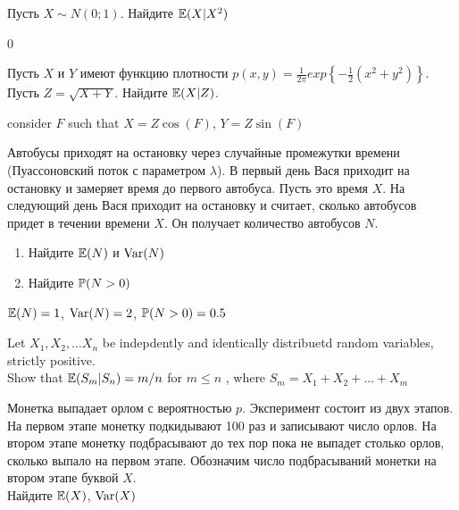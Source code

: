 \begin{solution}
\begin{solution}
\begin{solution}
\begin{solution}
\begin{solution}
\begin{solution}
\begin{solution}
\begin{problem}
Пусть $X\sim N(0;1)$. Найдите $\E(X|X^{2})$ 
\end{problem} 
\begin{solution} 
0
\end{solution}

\begin{problem}
Пусть $X$ и $Y$ имеют функцию плотности
$p(x,y)=\frac{1}{2\pi}exp\left\{-\frac{1}{2}\left(x^{2}+y^{2}\right)\right\}$.\\
Пусть $Z=\sqrt{X+Y}$. Найдите $\E(X|Z)$. 
\end{problem} 
\begin{solution} 

 consider $F$ such that $X=Z\cos(F)$, $Y=Z\sin(F)$ 
\end{solution}

\begin{problem}
Автобусы приходят на остановку через случайные промежутки времени (Пуассоновский поток с параметром $\lambda$). В первый день Вася приходит на остановку и замеряет время до первого автобуса. Пусть это время $X$. На следующий день Вася приходит на остановку и считает, сколько автобусов придет в течении времени $X$. Он получает количество автобусов $N$. 
\begin{enumerate}
\item Найдите $\E(N)$ и $\Var(N)$
\item Найдите $\P(N>0)$
\end{enumerate}
 
\end{problem} 
\begin{solution} 
$\E(N)=1$, $\Var(N)=2$, $\P(N>0)=0.5$
\end{solution}

\begin{problem}
Let $X_1, X_2, \ldots X_n$ be indepdently and identically distribuetd random variables, strictly positive. \\
Show that $\E(S_{m}|S_{n})= m/n$ for $m\le n$ , where $S_{m} = X_{1} + X_{2} + \ldots + X_{m}$ 
\end{problem} 
\begin{solution} 

\end{solution}

\begin{problem}
Монетка выпадает орлом с вероятностью $p$. Эксперимент состоит из двух этапов. На первом этапе монетку подкидывают 100 раз и записывают число орлов. На втором этапе монетку подбрасывают до тех пор пока не выпадет столько орлов, сколько выпало на первом этапе. Обозначим число подбрасываний монетки на втором этапе буквой $X$. \\
Найдите $\E(X)$, $\Var(X)$ 
\end{problem} 
\begin{solution} 


\end{solution}
\end{solution}
\end{solution}
\end{solution}
\end{solution}
\end{solution}
\end{solution}
\end{solution}
